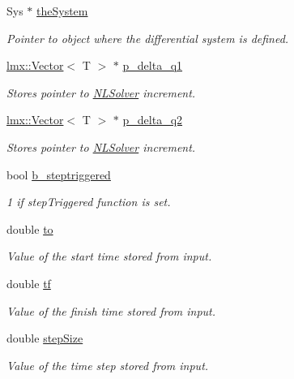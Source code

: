 \begin{DoxyCompactItemize}
Sys $\ast$ \hyperlink{classlmx_1_1DiffProblemDouble_ad53a4d138b69f0e7c0c9c758f736002c}{the\-System}
\begin{DoxyCompactList}\small\item\em Pointer to object where the differential system is defined. \end{DoxyCompactList}\item 
\hyperlink{classlmx_1_1Vector}{lmx\-::\-Vector}$<$ T $>$ $\ast$ \hyperlink{classlmx_1_1DiffProblemDouble_ad460462bffa8b3425e0e2df46d6bcf63}{p\-\_\-delta\-\_\-q1}
\begin{DoxyCompactList}\small\item\em Stores pointer to \hyperlink{classlmx_1_1NLSolver}{N\-L\-Solver} increment. \end{DoxyCompactList}\item 
\hyperlink{classlmx_1_1Vector}{lmx\-::\-Vector}$<$ T $>$ $\ast$ \hyperlink{classlmx_1_1DiffProblemDouble_a0f6147b1376247d0fc18327da7946401}{p\-\_\-delta\-\_\-q2}
\begin{DoxyCompactList}\small\item\em Stores pointer to \hyperlink{classlmx_1_1NLSolver}{N\-L\-Solver} increment. \end{DoxyCompactList}\item 
bool \hyperlink{classlmx_1_1DiffProblemDouble_aa9f4750227ae6f96a9d8f11627083e8d}{b\-\_\-steptriggered}
\begin{DoxyCompactList}\small\item\em 1 if step\-Triggered function is set. \end{DoxyCompactList}\item 
double \hyperlink{classlmx_1_1DiffProblemDouble_a19b2a71c676c67ee71de28fde7c97d54}{to}
\begin{DoxyCompactList}\small\item\em Value of the start time stored from input. \end{DoxyCompactList}\item 
double \hyperlink{classlmx_1_1DiffProblemDouble_a48be1fc2aba0df868106372d5e31e2ad}{tf}
\begin{DoxyCompactList}\small\item\em Value of the finish time stored from input. \end{DoxyCompactList}\item 
double \hyperlink{classlmx_1_1DiffProblemDouble_a65a47b229f04c1de32d33af03dd8b448}{step\-Size}
\begin{DoxyCompactList}\small\item\em Value of the time step stored from input. \end{DoxyCompactList}\item 

\end{DoxyCompactItemize}
